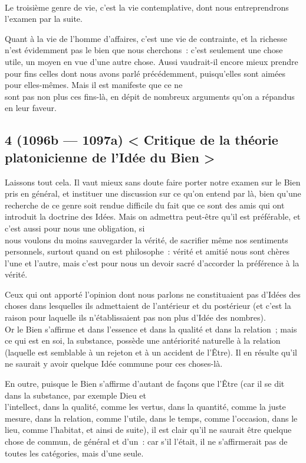 \documentclass[french,twoside]{book} %
\begin{document}
\\
Le troisième genre de vie, c’est la vie contemplative, dont nous entreprendrons l’examen par la suite.\par
Quant à la vie de l’homme d’affaires, c’est une vie de contrainte, et la richesse n’est évidemment pas le bien que nous cherchons : c’est seulement une chose utile, un moyen en vue d’une autre chose. Aussi vaudrait-il encore mieux prendre pour fins celles dont nous avons parlé précédemment, puisqu’elles sont aimées pour elles-mêmes. Mais il est manifeste que ce ne \\
sont pas non plus ces fins-là, en dépit de nombreux arguments qu’on a répandus en leur faveur.
\subsection[{4 (1096b — 1097a) < Critique de la théorie platonicienne de l’Idée du Bien >}]{4 (1096b — 1097a) < Critique de la théorie platonicienne de l’Idée du Bien >}
\noindent Laissons tout cela. Il vaut mieux sans doute faire porter notre examen sur le Bien pris en général, et instituer une discussion sur ce qu’on entend par là, bien qu’une recherche de ce genre soit rendue difficile du fait que ce sont des amis qui ont introduit la doctrine des Idées. Mais on admettra peut-être qu’il est préférable, et c’est aussi pour nous une obligation, si \\
nous voulons du moins sauvegarder la vérité, de sacrifier même nos sentiments personnels, surtout quand on est philosophe : vérité et amitié nous sont chères l’une et l’autre, mais c’est pour nous un devoir sacré d’accorder la préférence à la vérité.\par
Ceux qui ont apporté l’opinion dont nous parlons ne constituaient pas d’Idées des choses dans lesquelles ils admettaient de l’antérieur et du postérieur (et c’est la raison pour laquelle ils n’établissaient pas non plus d’Idée des nombres). \\
Or le Bien s’affirme et dans l’essence et dans la qualité et dans la relation ; mais ce qui est en soi, la substance, possède une antériorité naturelle à la relation (laquelle est semblable à un rejeton et à un accident de l’Être). Il en résulte qu’il ne saurait y avoir quelque Idée commune pour ces choses-là.\par
En outre, puisque le Bien s’affirme d’autant de façons que l’Être (car il se dit dans la substance, par exemple Dieu et \\
l’intellect, dans la qualité, comme les vertus, dans la quantité, comme la juste mesure, dans la relation, comme l’utile, dans le temps, comme l’occasion, dans le lieu, comme l’habitat, et ainsi de suite), il est clair qu’il ne saurait être quelque chose de commun, de général et d’un : car s’il l’était, il ne s’affirmerait pas de toutes les catégories, mais d’une seule.\par
\end{document}
